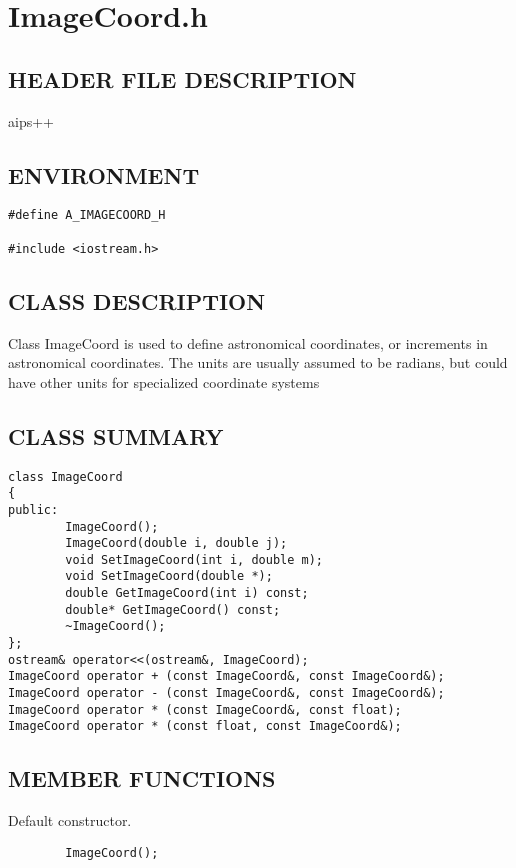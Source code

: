 \clearpage
\section{ImageCoord.h}

\subsection*{HEADER FILE DESCRIPTION}
 aips++
  
\subsection*{ENVIRONMENT}
\begin{verbatim}
#define A_IMAGECOORD_H

#include <iostream.h>
\end{verbatim}

\subsection*{CLASS DESCRIPTION}
          Class ImageCoord is used to define astronomical coordinates, or
   increments in astronomical coordinates. The units are usually assumed
   to be radians, but could have other units for specialized coordinate
   systems

\subsection*{CLASS SUMMARY}
\begin{verbatim}
class ImageCoord
{
public:
        ImageCoord();
        ImageCoord(double i, double j);
        void SetImageCoord(int i, double m);
        void SetImageCoord(double *);
        double GetImageCoord(int i) const;
        double* GetImageCoord() const;
        ~ImageCoord();
};
ostream& operator<<(ostream&, ImageCoord);
ImageCoord operator + (const ImageCoord&, const ImageCoord&);
ImageCoord operator - (const ImageCoord&, const ImageCoord&);
ImageCoord operator * (const ImageCoord&, const float);
ImageCoord operator * (const float, const ImageCoord&);
\end{verbatim}

\subsection*{MEMBER FUNCTIONS}
        Default constructor.
\begin{verbatim}
        ImageCoord();
\end{verbatim}

